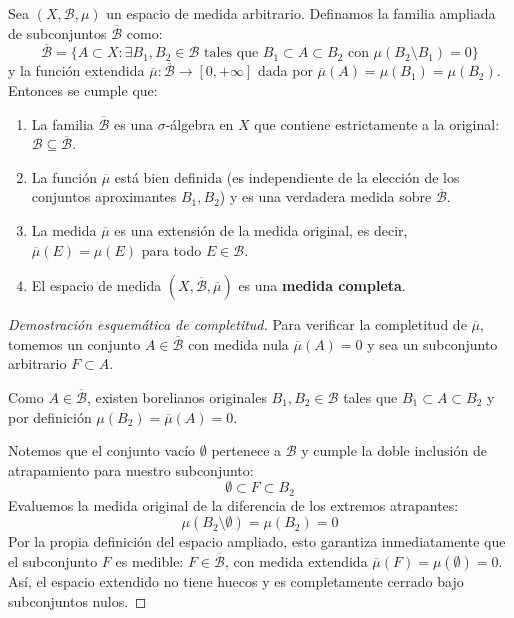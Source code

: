 \begin{teorema}
	Sea $(X, \mathcal{B}, \mu)$ un espacio de medida arbitrario. Definamos la familia ampliada de subconjuntos $\overline{\mathcal{B}}$ como:
	$$ \overline{\mathcal{B}} = \{ A \subset X : \exists B_1, B_2 \in \mathcal{B} \text{ tales que } B_1 \subset A \subset B_2 \text{ con } \mu(B_2 \setminus B_1) = 0 \} $$
	y la función extendida $\overline{\mu}: \overline{\mathcal{B}} \to [0, +\infty]$ dada por $\overline{\mu}(A) = \mu(B_1) = \mu(B_2)$. Entonces se cumple que:
	\begin{enumerate}[1)]
		\item La familia $\overline{\mathcal{B}}$ es una $\sigma$-álgebra en $X$ que contiene estrictamente a la original: $\mathcal{B} \subseteq \overline{\mathcal{B}}$.
		\item La función $\overline{\mu}$ está bien definida (es independiente de la elección de los conjuntos aproximantes $B_1, B_2$) y es una verdadera medida sobre $\overline{\mathcal{B}}$.
		\item La medida $\overline{\mu}$ es una extensión de la medida original, es decir, $\overline{\mu}(E) = \mu(E)$ para todo $E \in \mathcal{B}$.
		\item El espacio de medida $(X, \overline{\mathcal{B}}, \overline{\mu})$ es una \textbf{medida completa}.
	\end{enumerate}
\end{teorema}

\begin{proof}[Demostración esquemática de completitud]
	Para verificar la completitud de $\overline{\mu}$, tomemos un conjunto $A \in \overline{\mathcal{B}}$ con medida nula $\overline{\mu}(A) = 0$ y sea un subconjunto arbitrario $F \subset A$. 
	
	Como $A \in \overline{\mathcal{B}}$, existen borelianos originales $B_1, B_2 \in \mathcal{B}$ tales que $B_1 \subset A \subset B_2$ y por definición $\mu(B_2) = \overline{\mu}(A) = 0$. 
	
	Notemos que el conjunto vacío $\emptyset$ pertenece a $\mathcal{B}$ y cumple la doble inclusión de atrapamiento para nuestro subconjunto:
	$$ \emptyset \subset F \subset B_2 $$
	Evaluemos la medida original de la diferencia de los extremos atrapantes:
	$$ \mu(B_2 \setminus \emptyset) = \mu(B_2) = 0 $$
	Por la propia definición del espacio ampliado, esto garantiza inmediatamente que el subconjunto $F$ es medible: $F \in \overline{\mathcal{B}}$, con medida extendida $\overline{\mu}(F) = \mu(\emptyset) = 0$. Así, el espacio extendido no tiene huecos y es completamente cerrado bajo subconjuntos nulos.
\end{proof}

